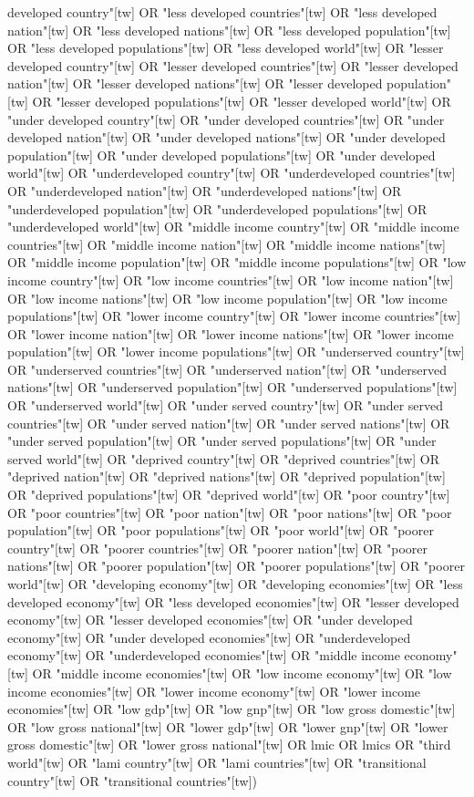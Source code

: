 \documentclass[12pt]{article}
\begin{document}
developed country"[tw] OR "less developed countries"[tw] OR "less developed nation"[tw] OR "less developed nations"[tw] OR "less developed population"[tw] OR "less developed populations"[tw] OR "less developed world"[tw] OR "lesser developed country"[tw] OR "lesser developed countries"[tw] OR "lesser developed nation"[tw] OR "lesser developed nations"[tw] OR "lesser developed population"[tw] OR "lesser developed populations"[tw] OR "lesser developed world"[tw] OR "under developed country"[tw] OR "under developed countries"[tw] OR "under developed nation"[tw] OR "under developed nations"[tw] OR "under developed population"[tw] OR "under developed populations"[tw] OR "under developed world"[tw] OR "underdeveloped country"[tw] OR "underdeveloped countries"[tw] OR "underdeveloped nation"[tw] OR "underdeveloped nations"[tw] OR "underdeveloped population"[tw] OR "underdeveloped populations"[tw] OR "underdeveloped world"[tw] OR "middle income country"[tw] OR "middle income countries"[tw] OR "middle income nation"[tw] OR "middle income nations"[tw] OR "middle income population"[tw] OR "middle income populations"[tw] OR "low income country"[tw] OR "low income countries"[tw] OR "low income nation"[tw] OR "low income nations"[tw] OR "low income population"[tw] OR "low income populations"[tw] OR "lower income country"[tw] OR "lower income countries"[tw] OR "lower income nation"[tw] OR "lower income nations"[tw] OR "lower income population"[tw] OR "lower income populations"[tw] OR "underserved country"[tw] OR "underserved countries"[tw] OR "underserved nation"[tw] OR "underserved nations"[tw] OR "underserved population"[tw] OR "underserved populations"[tw] OR "underserved world"[tw] OR "under served country"[tw] OR "under served countries"[tw] OR "under served nation"[tw] OR "under served nations"[tw] OR "under served population"[tw] OR "under served populations"[tw] OR "under served world"[tw] OR "deprived country"[tw] OR "deprived countries"[tw] OR "deprived nation"[tw] OR "deprived nations"[tw] OR "deprived population"[tw] OR "deprived populations"[tw] OR "deprived world"[tw] OR "poor country"[tw] OR "poor countries"[tw] OR "poor nation"[tw] OR "poor nations"[tw] OR "poor population"[tw] OR "poor populations"[tw] OR "poor world"[tw] OR "poorer country"[tw] OR "poorer countries"[tw] OR "poorer nation"[tw] OR "poorer nations"[tw] OR "poorer population"[tw] OR "poorer populations"[tw] OR "poorer world"[tw] OR "developing economy"[tw] OR "developing economies"[tw] OR "less developed economy"[tw] OR "less developed economies"[tw] OR "lesser developed economy"[tw] OR "lesser developed economies"[tw] OR "under developed economy"[tw] OR "under developed economies"[tw] OR "underdeveloped economy"[tw] OR "underdeveloped economies"[tw] OR "middle income economy"[tw] OR "middle income economies"[tw] OR "low income economy"[tw] OR "low income economies"[tw] OR "lower income economy"[tw] OR "lower income economies"[tw] OR "low gdp"[tw] OR "low gnp"[tw] OR "low gross domestic"[tw] OR "low gross national"[tw] OR "lower gdp"[tw] OR "lower gnp"[tw] OR "lower gross domestic"[tw] OR "lower gross national"[tw] OR lmic OR lmics OR "third world"[tw] OR "lami country"[tw] OR "lami countries"[tw] OR "transitional country"[tw] OR "transitional countries"[tw])
\end{document}
